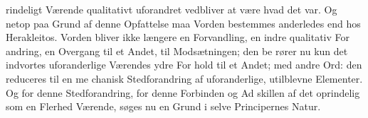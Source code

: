 \documentclass[12pt,a4paper]{book}
\begin{document}
%
%
%
%
rindeligt Værende qualitativt uforandret vedbliver at være hvad
det var. Og netop paa Grund af denne Opfattelse maa
Vorden bestemmes anderledes end hos Herakleitos. Vorden
bliver ikke længere en Forvandling, en indre qualitativ For\-%
andring, en Overgang til et Andet, til Modsætningen; den be\-%
rører nu kun det indvortes uforanderlige Værendes ydre For\-%
hold til et Andet; med andre Ord: den reduceres til en me\-%
chanisk Stedforandring af uforanderlige, utilblevne Elementer.
Og for denne Stedforandring, for denne Forbinden og Ad\-%
skillen af det oprindelig som en Flerhed Værende, søges nu
en Grund i selve Principernes Natur.
\end{document}
